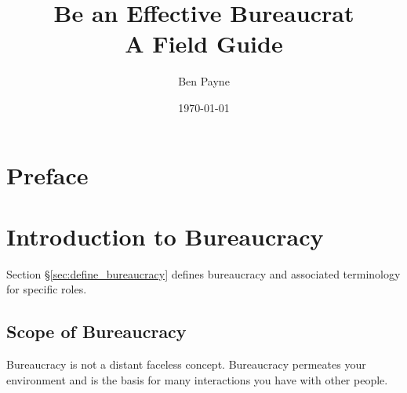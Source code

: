 \documentclass{book}
\title{Be an Effective Bureaucrat\\
A Field Guide}
\author{Ben Payne}
\date{\today}
\begin{document}




\begin{titlepage}
\maketitle
\thispagestyle{empty}
\end{titlepage}
\clearpage

\frontmatter %

\clearpage

\chapter*{Preface}%

\hypertarget{contents}{}
\tableofcontents

\mainmatter %


\chapter{Introduction to Bureaucracy}

  Section \S\ref{sec:define_bureaucracy} defines bureaucracy and associated terminology for specific roles.

  \clearpage 
  \clearpage
  \clearpage 
  \clearpage
  \section{Scope of Bureaucracy}
  Bureaucracy is not a distant faceless concept. Bureaucracy permeates your environment and is the basis for many interactions you have with other people. 
\end{document}
